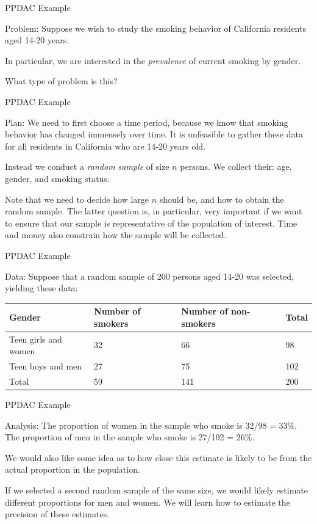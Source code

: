 \documentclass[ignorenonframetext,aspectratio=169]{beamer}
\begin{document}
\begin{frame}{PPDAC Example}

Problem: Suppose we wish to study the smoking behavior of California
residents aged 14-20 years.

In particular, we are interested in the \emph{prevalence} of current
smoking by gender.

What type of problem is this?

\end{frame}

\begin{frame}{PPDAC Example}

Plan: We need to first choose a time period, because we know that
smoking behavior has changed immensely over time. It is unfeasible to
gather these data for all residents in California who are 14-20 years
old.

Instead we conduct a \emph{random sample} of size \(n\) persons. We
collect their: age, gender, and smoking status.

Note that we need to decide how large \(n\) should be, and how to obtain
the random sample. The latter question is, in particular, very important
if we want to ensure that our sample is representative of the population
of interest. Time and money also constrain how the sample will be
collected.

\end{frame}

\begin{frame}{PPDAC Example}

Data: Suppose that a random sample of 200 persons aged 14-20 was
selected, yielding these data:

\begin{longtable}[]{@{}llll@{}}
\toprule
Gender & Number of smokers & Number of non-smokers &
Total\tabularnewline
\midrule
\endhead
Teen girls and women & 32 & 66 & 98\tabularnewline
Teen boys and men & 27 & 75 & 102\tabularnewline
Total & 59 & 141 & 200\tabularnewline
\bottomrule
\end{longtable}

\end{frame}

\begin{frame}{PPDAC Example}

Analysis: The proportion of women in the sample who smoke is 32/98 =
33\%. The proportion of men in the sample who smoke is 27/102 = 26\%.

We would also like some idea as to how close this estimate is likely to
be from the actual proportion in the population.

If we selected a second random sample of the same size, we would likely
estimate different proportions for men and women. We will learn how to
estimate the precision of these estimates.

\end{frame}
\end{document}
